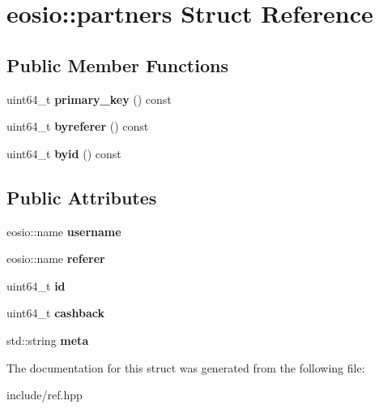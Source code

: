 \hypertarget{structeosio_1_1partners}{}\section{eosio\+:\+:partners Struct Reference}
\label{structeosio_1_1partners}
\subsection*{Public Member Functions}
\begin{DoxyCompactItemize}
\item 
\mbox{\label{structeosio_1_1partners_a8b8052384c5c36a4e29d2d13241dc421}} 
uint64\+\_\+t {\bfseries primary\+\_\+key} () const
\item 
\mbox{\label{structeosio_1_1partners_a9fee5eb1435e576dd33ea31c809bbc37}} 
uint64\+\_\+t {\bfseries byreferer} () const
\item 
\mbox{\label{structeosio_1_1partners_a930880b4c45d14aaafaf36c6ab2f8164}} 
uint64\+\_\+t {\bfseries byid} () const
\end{DoxyCompactItemize}
\subsection*{Public Attributes}
\begin{DoxyCompactItemize}
\item 
\mbox{\label{structeosio_1_1partners_a79d7b95e1d84916b270f8162ec11f425}} 
eosio\+::name {\bfseries username}
\item 
\mbox{\label{structeosio_1_1partners_ac3a4bb6a6044a5afbf01348ad0eb3166}} 
eosio\+::name {\bfseries referer}
\item 
\mbox{\label{structeosio_1_1partners_a642870b4cb9cac23aab6bffb1814f6a8}} 
uint64\+\_\+t {\bfseries id}
\item 
\mbox{\label{structeosio_1_1partners_a47f66ecebb0b5aec95f5685df4e6f2e1}} 
uint64\+\_\+t {\bfseries cashback}
\item 
\mbox{\label{structeosio_1_1partners_a157b389230b1d1163131fe95d8f9e148}} 
std\+::string {\bfseries meta}
\end{DoxyCompactItemize}


The documentation for this struct was generated from the following file\+:\begin{DoxyCompactItemize}
\item 
include/ref.\+hpp\end{DoxyCompactItemize}
